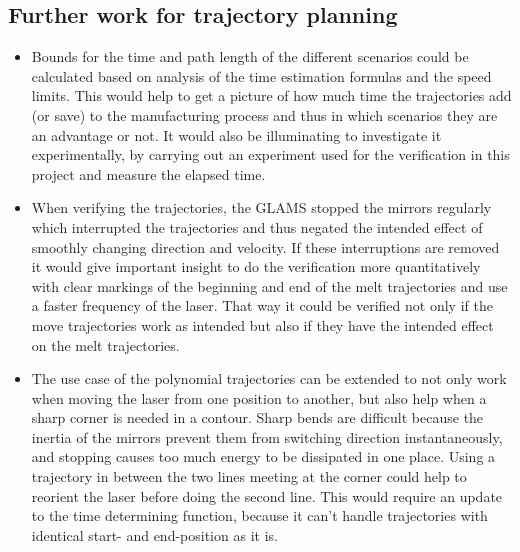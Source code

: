 \subsection{Further work for trajectory planning}
\begin{itemize}
    \item Bounds for the time and path length of the different scenarios could be calculated based on analysis of the time estimation formulas and the speed limits. This would help to get a picture of how much time the trajectories add (or save) to the manufacturing process and thus in which scenarios they are an advantage or not. It would also be illuminating to investigate it experimentally, by carrying out an experiment used for the verification in this project and measure the elapsed time.
    \item When verifying the trajectories, the GLAMS stopped the mirrors regularly which interrupted the trajectories and thus negated the intended effect of smoothly changing direction and velocity. If these interruptions are removed it would give important insight to do the verification more quantitatively with clear markings of the beginning and end of the melt trajectories and use a faster frequency of the laser. That way it could be verified not only if the move trajectories work as intended but also if they have the intended effect on the melt trajectories.
    \item The use case of the polynomial trajectories can be extended to not only work when moving the laser from one position to another, but also help when a sharp corner is needed in a contour. Sharp bends are difficult because the inertia of the mirrors prevent them from switching direction instantaneously, and stopping causes too much energy to be dissipated in one place. Using a trajectory in between the two lines meeting at the corner could help to reorient the laser before doing the second line. This would require an update to the time determining function, because it can't handle trajectories with identical start- and end-position as it is.
\end{itemize}